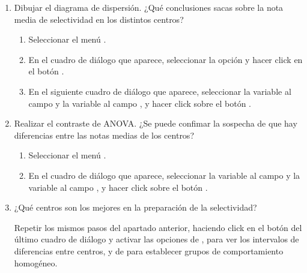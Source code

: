 \begin{enumerate}[leftmargin=*]
\begin{enumerate}
\item Dibujar el diagrama de dispersión. ¿Qué conclusiones sacas sobre la nota media de selectividad en los distintos centros?
\begin{indicacion}
\begin{enumerate}
\item Seleccionar el menú .
\item En el cuadro de diálogo que aparece, seleccionar la opción 
y hacer click en el botón .
\item En el siguiente cuadro de diálogo que aparece, seleccionar la variable  al campo  y la variable
 al campo , y hacer click sobre el botón .
\end{enumerate}
\end{indicacion}

\item Realizar el contraste de ANOVA. ¿Se puede confimar la sospecha de que hay diferencias entre las notas medias de los centros?
\begin{indicacion}
\begin{enumerate}
\item Seleccionar el menú .
\item En el cuadro de diálogo que aparece, seleccionar la variable  al campo  y la variable
 al campo , y hacer click sobre el botón .
\end{enumerate}
\end{indicacion}

\item ¿Qué centros son los mejores en la preparación de la selectividad?
\begin{indicacion}
Repetir los mismos pasos del apartado anterior, haciendo click en el botón  del último cuadro de diálogo y activar las
opciones de , para ver los intervalos de diferencias entre centros, y de  para establecer grupos de
comportamiento homogéneo.
\end{indicacion}
\end{enumerate}
\end{enumerate}

\clearpage
\newpage


